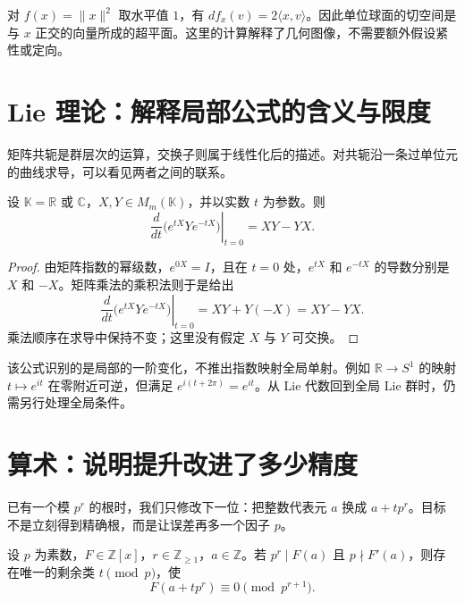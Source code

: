 \documentclass[11pt,a4paper,fontset=fandol,scheme=plain]{ctexart}
\begin{document}
对 $f(x)=\lVert x\rVert^2$ 取水平值 $1$，有 $df_x(v)=2\langle x,v\rangle$。因此单位球面的切空间是与 $x$ 正交的向量所成的超平面。这里的计算解释了几何图像，不需要额外假设紧性或定向。



\clearpage
\section{Lie 理论：解释局部公式的含义与限度}

矩阵共轭是群层次的运算，交换子则属于线性化后的描述。对共轭沿一条过单位元的曲线求导，可以看见两者之间的联系。

\begin{proposition}[共轭的无穷小变化]\label{thm:conjugation-differential}

设 $\mathbb K=\mathbb R$ 或 $\mathbb C$，$X,Y\in M_m(\mathbb K)$，并以实数 $t$ 为参数。则
\[
\left.\frac{d}{dt}\bigl(e^{tX}Ye^{-tX}\bigr)\right|_{t=0}
=XY-YX.
\]

\end{proposition}

\begin{proof}

由矩阵指数的幂级数，$e^{0X}=I$，且在 $t=0$ 处，$e^{tX}$ 和 $e^{-tX}$ 的导数分别是 $X$ 和 $-X$。矩阵乘法的乘积法则于是给出
\[
\left.\frac{d}{dt}\bigl(e^{tX}Ye^{-tX}\bigr)\right|_{t=0}
=XY+Y(-X)=XY-YX.
\]
乘法顺序在求导中保持不变；这里没有假定 $X$ 与 $Y$ 可交换。
\end{proof}

该公式识别的是局部的一阶变化，不推出指数映射全局单射。例如 $\mathbb R\to S^1$ 的映射 $t\mapsto e^{it}$ 在零附近可逆，但满足 $e^{i(t+2\pi)}=e^{it}$。从 Lie 代数回到全局 Lie 群时，仍需另行处理全局条件。

\clearpage
\section{算术：说明提升改进了多少精度}

已有一个模 $p^r$ 的根时，我们只修改下一位：把整数代表元 $a$ 换成 $a+t p^r$。目标不是立刻得到精确根，而是让误差再多一个因子 $p$。

\begin{proposition}[简单根的一步提升]\label{thm:one-step-lifting}

设 $p$ 为素数，$F\in\mathbb Z[x]$，$r\in\mathbb Z_{\ge1}$，$a\in\mathbb Z$。若 $p^r\mid F(a)$ 且 $p\nmid F'(a)$，则存在唯一的剩余类 $t\pmod p$，使
\[
F(a+t p^r)\equiv0\pmod{p^{r+1}}.
\]

\end{proposition}
\end{document}
